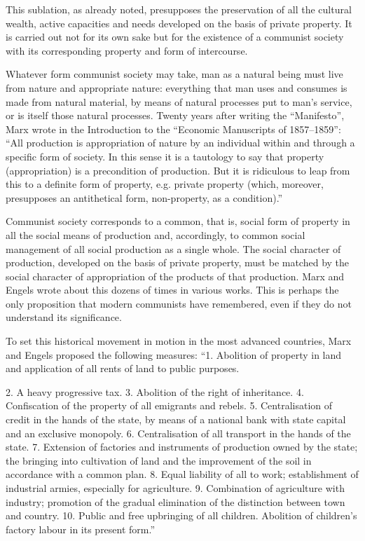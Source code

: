 \documentclass[12pt,a4paper,openany]{book}
\begin{document}
This sublation, as already noted, presupposes the preservation of all the cultural wealth, active capacities and needs developed on the basis of private property. It is carried out not for its own sake but for the existence of a communist society with its corresponding property and form of intercourse.

Whatever form communist society may take, man as a natural being must live from nature and appropriate nature: everything that man uses and consumes is made from natural material, by means of natural processes put to man’s service, or is itself those natural processes. Twenty years after writing the “Manifesto”, Marx wrote in the Introduction to the “Economic Manuscripts of 1857–1859”: “All production is appropriation of nature by an individual within and through a specific form of society. In this sense it is a tautology to say that property (appropriation) is a precondition of production. But it is ridiculous to leap from this to a definite form of property, e.g. private property (which, moreover, presupposes an antithetical form, non-property, as a condition).”

Communist society corresponds to a common, that is, social form of property in all the social means of production and, accordingly, to common social management of all social production as a single whole. The social character of production, developed on the basis of private property, must be matched by the social character of appropriation of the products of that production. Marx and Engels wrote about this dozens of times in various works. This is perhaps the only proposition that modern communists have remembered, even if they do not understand its significance.

To set this historical movement in motion in the most advanced countries, Marx and Engels proposed the following measures: “1. Abolition of property in land and application of all rents of land to public purposes.

2. A heavy progressive tax. 3. Abolition of the right of inheritance. 4. Confiscation of the property of all emigrants and rebels. 5. Centralisation of credit in the hands of the state, by means of a national bank with state capital and an exclusive monopoly. 6. Centralisation of all transport in the hands of the state. 7. Extension of factories and instruments of production owned by the state; the bringing into cultivation of land and the improvement of the soil in accordance with a common plan. 8. Equal liability of all to work; establishment of industrial armies, especially for agriculture. 9. Combination of agriculture with industry; promotion of the gradual elimination of the distinction between town and country. 10. Public and free upbringing of all children. Abolition of children’s factory labour in its present form.”
\end{document}
